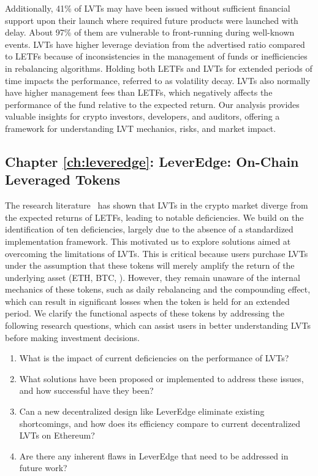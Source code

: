 Additionally, 41\% of LVTs may have been issued without sufficient financial support upon their launch where required future products were launched with delay. About 97\% of them are vulnerable to front-running during well-known events. LVTs have higher leverage deviation from the advertised ratio compared to LETFs because of inconsistencies in the management of funds or inefficiencies in rebalancing algorithms. Holding both LETFs and LVTs for extended periods of time impacts the performance, referred to as volatility decay. LVTs also normally have higher management fees than LETFs, which negatively affects the performance of the fund relative to the expected return. Our analysis provides valuable insights for crypto investors, developers, and auditors, offering a framework for understanding LVT mechanics, risks, and market impact.

\subsection*{Chapter \ref{ch:leveredge}: LeverEdge: On-Chain Leveraged Tokens} 
The research literature~\cite{shortfall,khomyn2020value,szpruch2024leveraged,Sullivan_2009} has shown that LVTs in the crypto market diverge from the expected returns of LETFs, leading to notable deficiencies. We build on the identification of ten deficiencies, largely due to the absence of a standardized implementation framework. This motivated us to explore solutions aimed at overcoming the limitations of LVTs. This is critical because users purchase LVTs under the assumption that these tokens will merely amplify the return of the underlying asset (ETH, BTC, \etc). However, they remain unaware of the internal mechanics of these tokens, such as daily rebalancing and the compounding effect, which can result in significant losses when the token is held for an extended period. We clarify the functional aspects of these tokens by addressing the following research questions, which can assist users in better understanding LVTs before making investment decisions.
\begin{enumerate} [label={(RQ4.\arabic*)},leftmargin=*]
	\item What is the impact of current deficiencies on the performance of LVTs?
	\item What solutions have been proposed or implemented to address these issues, and how successful have they been?
	\item Can a new decentralized design like LeverEdge eliminate existing shortcomings, and how does its efficiency compare to current decentralized LVTs on Ethereum?
	\item Are there any inherent flaws in LeverEdge that need to be addressed in future work?
\end{enumerate}
